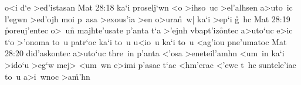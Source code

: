 o<i
d`e
>ed'istasan\bibvsend
\vs Mat 28:18
ka`i
proselj`wn
<o
>ihso~uc
>el'alhsen
a>uto~ic
l'egwn
>ed'ojh
moi
p~asa
>exous'ia
>en
o>ura\r{n}~w|
ka`i
>ep`i
\r{g}~hc\bibvsend
{}
\vs Mat 28:19
\r{p}oreuj'entec
o>~u\r{n}
majhte'usate
p'anta
t`a
>'ejnh
vbapt'iz\r{o}ntec
a>uto`uc
e>ic
t`o
>'onoma
to~u
patr`oc
ka`i
to~u
u<io~u
ka`i
to~u
<ag'iou
pne'umatoc\bibvsend
\vs Mat 28:20
did'askontec
a>uto`uc
thre~in
p'anta
<'osa
>eneteil'amhn
<um~in
ka`i
>ido`u
>eg`w
mej>
<um~wn
e>imi
p'asac
t`ac
<hm'erac
<'ewc
t~hc
suntele'iac
to~u
a>i~wnoc
>a\r{m}'hn\bibvsend
{}
